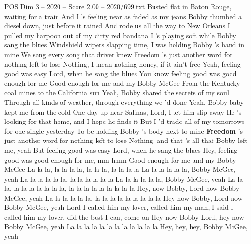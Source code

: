 \begin{textsample}{POS Dim 3 – 2020 – Score 2.00 – 2020/699.txt}  \label{ex:f3_pos_001}
Busted flat in Baton Rouge, waiting for a train And I 's feeling near as faded as my jeans Bobby thumbed a diesel down, just before it rained And rode us all the way to New Orleans I pulled my harpoon out of my dirty red bandana I 's playing soft while Bobby sang the blues Windshield wipers slapping time, I was holding Bobby 's hand in mine We sang every song that driver knew Freedom 's just another word for nothing left to lose Nothing, I mean nothing honey, if it ain't free Yeah, feeling good was easy Lord, when he sang the blues You know feeling good was good enough for me Good enough for me and my Bobby McGee From the Kentucky coal mines to the California sun Yeah, Bobby shared the secrets of my soul Through all kinds of weather, through everything we 'd done Yeah, Bobby baby kept me from the cold One day up near Salinas, Lord, I let him slip away He 's looking for that home, and I hope he finds it But I 'd trade all of my tomorrows for one single yesterday To be holding Bobby 's body next to mine \textbf{Freedom} 's just another word for nothing left to lose Nothing, and that 's all that Bobby left me, yeah But feeling good was easy Lord, when he sang the blues Hey, feeling good was good enough for me, mm-hmm Good enough for me and my Bobby McGee La la la, la la la la, la la la, la la la la La la la la la la, Bobby McGee, yeah La la la la la la, la la la la la la La la la la la la, Bobby McGee, yeah La la la, la la la la la la la, la la la la la la la la la Hey, now Bobby, Lord now Bobby McGee, yeah La la la la la la, la la la la la la la la la Hey now Bobby, Lord now Bobby McGee, yeah Lord I called him my lover, called him my man, I said I called him my lover, did the best I can, come on Hey now Bobby Lord, hey now Bobby McGee, yeah La la la la la la la la la la la la Hey, hey, hey, Bobby McGee, yeah!

\end{textsample}
